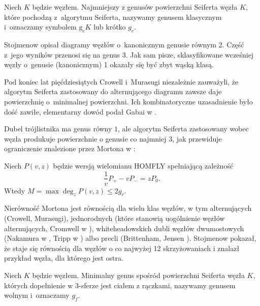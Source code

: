 \begin{definition}
%
    Niech $K$ będzie węzłem.
    Najmniejszy z genusów powierzchni Seiferta węzła $K$, które pochodzą z~algorytmu Seiferta, nazywamy genusem klasycznym i~oznaczamy symbolem $\operatorname{g_c} K$ lub krótko $g_c$.
\end{definition}

Stojmenow \cite{stoimenow08} opisał diagramy węzłów o~kanonicznym genusie równym 2.
Część z~jego wyników przenosi się na genus 3.
Jak sam pisze, sklasyfikowane wcześniej węzły o~genusie (kanonicznym) 1 okazały się być zbyt wąską klasą.

Pod koniec lat pięćdziesiątych Crowell i~Murasugi niezależnie zauważyli, że algorytm Seiferta zastosowany do alternującego diagramu zawsze daje powierzchnię o~minimalnej powierzchni.
Ich kombinatoryczne uzasadnienie było dość zawiłe, elementarny dowód podał Gabai w \cite{gabai86}.

Dubel trójlistnika ma genus równy $1$, ale algorytm Seiferta zastosowany wobec węzła produkuje powierzchnie o genusie co najmniej $3$, jak przewiduje ograniczenie znalezione przez Mortona w \cite[twierdzenie 2]{morton86}:

\begin{proposition}
    Niech $P(v, z)$ będzie wersją wielomianu HOMFLY spełniającą zależność
    \begin{equation}
        \frac 1v P_+ - vP_- = zP_0.
    \end{equation}
    Wtedy $M = \max \deg_z P(v, z) \le 2g_c$.
\end{proposition}

Nierówność Mortona jest równością dla wielu klas węzłów, w tym alternujących (Crowell, Murasugi), jednorodnych (które stanowią uogólnienie węzłów alternujących, Cromwell w \cite{cromwell89}), whiteheadowskich dubli węzłów dwumostowych (Nakamura w \cite{nakamura06}, Tripp w \cite{tripp02}) albo precli (Brittenham, Jensen \cite{brittenham06}).
%
%
%
%
%
%
Stojmenow pokazał, że staje się równością dla węzłów o co najwyżej 12 skrzyżowaniach i znalazł przykład węzła, dla którego jest ostra.

\begin{definition}
    Niech $K$ będzie węzłem.
    Minimalny genus spośród powierzchni Seiferta węzła $K$, których dopełnienie w 3-sferze jest ciałem z rączkami, nazywamy genusem wolnym i~oznaczamy $g_f$.
\end{definition}

